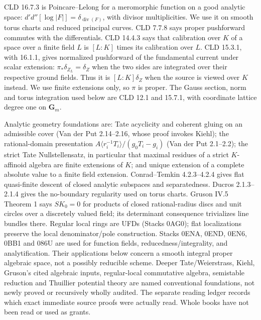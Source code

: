 CLD 16.7.3 is Poincare--Lelong for a meromorphic function on a good analytic
space: $d'd''[\log|F|]=\delta_{\operatorname{div}(F)}$, with divisor
multiplicities. We use it on smooth torus charts and reduced principal curves.
CLD 7.7.8 says proper pushforward commutes with the differentials.
CLD 14.4.3 says that calibration over $K$ of a space over a finite field $L$
is $[L:K]$ times its calibration over $L$.
CLD 15.3.1, with 16.1.1, gives normalized pushforward of the fundamental
current under scalar extension: $\pi_*\delta_{Z_L}=\delta_Z$ when the two
sides are integrated over their respective ground fields. Thus it is
$[L:K]\delta_Z$ when the source is viewed over $K$ instead.
We use finite extensions only, so $\pi$ is proper.
The Gauss section, norm and torus integration used below are CLD 12.1 and
15.7.1, with coordinate lattice degree one on $\mathbf G_m$.

Analytic geometry foundations are: Tate acyclicity and coherent gluing on an
admissible cover (Van der Put 2.14--2.16, whose proof invokes Kiehl);
the rational-domain presentation
$A\langle r_i^{-1}T_i\rangle/(g_0T_i-g_i)$ (Van der Put 2.1--2.2);
the strict Tate Nullstellensatz, in particular that maximal residues of a strict
$K$-affinoid algebra are finite extensions of $K$; and unique extension of
a complete absolute value to a finite field extension.
Conrad--Temkin 4.2.3--4.2.4 gives flat quasi-finite descent of closed analytic
subspaces and separatedness. Ducros 2.1.3--2.1.4 gives the no-boundary
regularity used on torus charts. Gruson IV.5 Theorem 1 says $SK_0=0$ for
products of closed rational-radius discs and unit circles over a discretely
valued field; its determinant consequence trivializes line bundles there.
Regular local rings are UFDs (Stacks 0AG0); flat localizations preserve the
local denominator/pole construction. Stacks 0ENA, 0END, 0EN6, 0BB1 and 086U
are used for function fields, reducedness/integrality, and analytification.
Their applications below concern a smooth integral proper algebraic space,
not a possibly reducible scheme.
Deeper Tate/Weierstrass, Kiehl, Gruson's cited algebraic inputs, regular-local
commutative algebra, semistable reduction and Thuillier potential theory are
named conventional foundations, not newly proved or recursively wholly audited.
The separate reading ledger records which exact immediate source proofs were
actually read. Whole books have not been read or used as grants.

